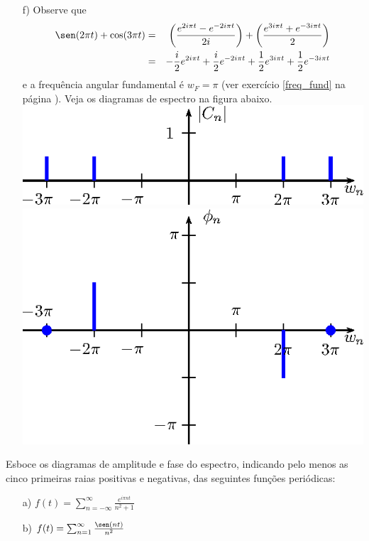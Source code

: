 \begin{resp}
\begin{itemize}
\item [f)]
 Observe que 
\begin{eqnarray*}
\sen(2\pi t)+\cos(3\pi t)&=&\left(\frac{e^{2i\pi t}-e^{-2i\pi t}}{2i}\right)+\left(\frac{e^{3i\pi t}+e^{-3i\pi t}}{2}\right)\\
&=& -\frac{i}{2}e^{2i\pi t}+\frac{i}{2}e^{-2i\pi t}+\frac{1}{2}e^{3i\pi t}+\frac{1}{2}e^{-3i\pi t}
\end{eqnarray*}
e a frequência angular fundamental é $w_F=\pi$ (ver exercício \ref{freq_fund} na página \pageref{freq_fund}).  Veja os diagramas de espectro na figura abaixo.
\includegraphics{cap_diagramas_espectro/pics/figura_16}
\includegraphics{cap_diagramas_espectro/pics/figura_17}
\end{itemize}
\end{resp}
\begin{exer}
Esboce os diagramas de amplitude e fase do espectro, indicando pelo menos as cinco primeiras raias positivas e negativas, das seguintes funções periódicas:
\begin{itemize}
\item[a)] $f(t)=\sum_{n=-\infty}^\infty \frac{e^{i \pi n t}}{n^2+1}$
\item[b)] $f(t)=\sum_{n=1}^\infty \frac{\sen(nt)}{n^2}$
\end{itemize}
\end{exer}
